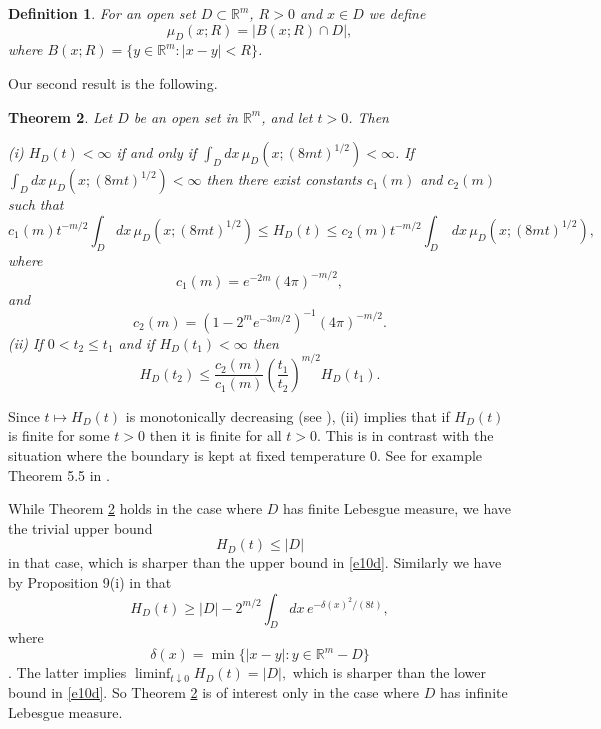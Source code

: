 \documentclass[a4paper,9pt]{amsart}
\newtheorem{theorem}{Theorem}
\newtheorem{definition}[theorem]{Definition}
\begin{document}
\begin{definition}\label{def2} For an open set $D \subset {\mathbb{R}}^m$, $R>0$ and
$x\in D$ we define
\begin{equation*}
\mu_D(x;R)=|B(x;R)\cap D|,
\end{equation*}
where $B(x;R) = \{y \in {\mathbb{R}}^{m} : \vert x - y \vert < R\}$.
\end{definition}
Our second result is the following.

\begin{theorem}\label{the2} Let $D$ be an open set in ${\mathbb{R}}^m$, and let
$t>0$. Then

\noindent \textup{(i)} $H_D(t)<\infty$ if and only if
$\int_Ddx \, \mu_D(x;(8mt)^{1/2})<\infty$. If
$\int_Ddx \, \mu_D(x;(8mt)^{1/2})<\infty$ then there exist constants
$c_1(m)$ and $c_2(m)$ such that
\begin{equation}\label{e10d}
c_1(m)t^{-m/2}\int_Ddx \, \mu_D(x;(8mt)^{1/2})\le H_D(t)\le
c_2(m)t^{-m/2}\int_D \, dx \, \mu_D(x;(8mt)^{1/2}),
\end{equation}
where
\begin{equation*}
c_1(m)=e^{-2m}(4\pi)^{-m/2},
\end{equation*}
and
\begin{equation*}
c_2(m)=\left(1-2^me^{-3m/2}\right)^{-1}(4\pi)^{-m/2}.
\end{equation*}
\noindent \textup{(ii)} If $0<t_2\le t_1$ and if $H_D(t_1)<\infty$
then
\begin{equation}\label{e10g}
H_D(t_2)\le
\frac{c_2(m)}{c_1(m)}\left(\frac{t_1}{t_2}\right)^{m/2}H_D(t_1).
\end{equation}
\end{theorem}
Since $t\mapsto H_D(t)$ is monotonically decreasing (see
\cite{mP03}), (ii) implies that if $H_D(t)$ is finite for some
$t>0$ then it is finite for all $t>0$. This is in contrast with
the situation where the boundary is kept at fixed temperature $0$.
See for example Theorem 5.5 in \cite{vdBD89}.

While Theorem \ref{the2} holds in the case where $D$ has finite Lebesgue measure,
we have the trivial upper bound
\begin{equation}\label{e10g1}
H_D(t)\le |D|
\end{equation}
in that case, which is sharper than the upper bound in
\eqref{e10d}. Similarly we have by Proposition 9(i) in \cite{mvdB13} that
\begin{equation}\label{e10g2}
H_D(t)\ge |D|-2^{m/2}\int_Ddx \, e^{-\delta(x)^2/(8t)},
\end{equation}
where
$$\delta(x) = \min \{ \vert x - y \vert : y \in {\mathbb{R}}^{m} -
D\}$$.
The latter implies $\liminf_{t\downarrow 0} H_D(t)=|D|,$
which is sharper than the lower bound in \eqref{e10d}. So Theorem
\ref{the2} is of interest only in the case where $D$ has infinite
Lebesgue measure.
\end{document}
